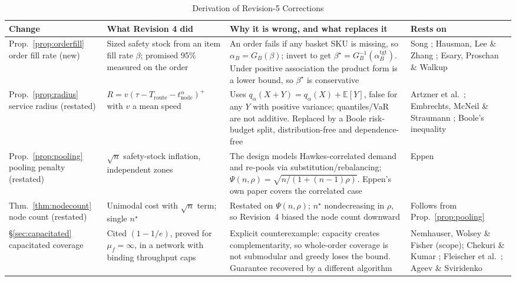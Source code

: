 \begin{table}[t]
\caption{Derivation of Revision-5 Corrections}
\label{tab:derivation}
\centering\footnotesize
\begin{tabular}{@{}p{2.5cm}p{5.4cm}p{5.4cm}p{3.0cm}@{}}
\toprule
\textbf{Change} & \textbf{What Revision 4 did} & \textbf{Why it is wrong, and what replaces it} & \textbf{Rests on}\\
\midrule
Prop.~\ref{prop:orderfill} order fill rate (new) & Sized safety stock from an item fill rate $\beta$; promised 95\% measured on the order & An order fails if any basket SKU is missing, so $\alpha_B=G_B(\beta)$; invert to get $\beta^\star=G_B^{-1}(\alpha_B^{\mathrm{tgt}})$. Under positive association the product form is a lower bound, so $\beta^\star$ is conservative & Song \cite{song1998}; Hausman, Lee \& Zhang \cite{hausman1998}; Esary, Proschan \& Walkup \cite{esary1967}\\
Prop.~\ref{prop:radius} service radius (restated) & $R=v(\tau-T_{\mathrm{route}}-t^{\alpha}_{\mathrm{node}})^{+}$ with $v$ a mean speed & Uses $q_\alpha(X+Y)=q_\alpha(X)+\mathbb{E}[Y]$, false for any $Y$ with positive variance; quantiles/VaR are not additive. Replaced by a Boole risk-budget split, distribution-free and dependence-free & Artzner et al.\ \cite{artzner1999}; Embrechts, McNeil \& Straumann \cite{embrechts2002}; Boole's inequality \cite{feller1968}\\
Prop.~\ref{prop:pooling} pooling penalty (restated) & $\sqrt{n}$ safety-stock inflation, independent zones & The design models Hawkes-correlated demand and re-pools via substitution/rebalancing; $\Psi(n,\rho)=\sqrt{n/(1+(n-1)\rho)}$. Eppen's own paper covers the correlated case & Eppen \cite{eppen1979}\\
Thm.~\ref{thm:nodecount} node count (restated) & Unimodal cost with $\sqrt n$ term; single $n^\star$ & Restated on $\Psi(n,\rho)$; $n^\star$ nondecreasing in $\rho$, so Revision~4 biased the node count downward & Follows from Prop.~\ref{prop:pooling}\\
\S\ref{sec:capacitated} capacitated coverage & Cited $(1-1/e)$, proved for $\mu_f=\infty$, in a network with binding throughput caps & Explicit counterexample: capacity creates complementarity, so whole-order coverage is not submodular and greedy loses the bound. Guarantee recovered by a different algorithm & Nemhauser, Wolsey \& Fisher \cite{nemhauser1978} (scope); Chekuri \& Kumar \cite{chekuri2004}; Fleischer et al.\ \cite{fleischer2011}; Ageev \& Sviridenko \cite{ageev2004}\\

\end{tabular}
\end{table}
